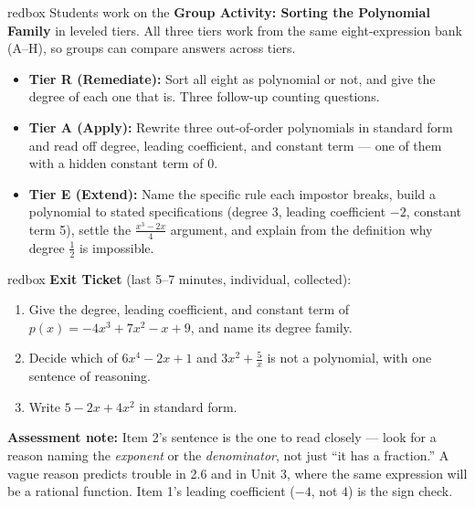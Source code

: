 \documentclass[10pt]{article}
\begin{document}
\begin{skillbox}{redbox}
Students work on the \textbf{Group Activity: Sorting the Polynomial Family} in
leveled tiers. All three tiers work from the same eight-expression bank (A--H), so
groups can compare answers across tiers.

\begin{itemize}
  \item \textbf{Tier R (Remediate):} Sort all eight as polynomial or not, and give
        the degree of each one that is. Three follow-up counting questions.
  \item \textbf{Tier A (Apply):} Rewrite three out-of-order polynomials in standard
        form and read off degree, leading coefficient, and constant term --- one
        of them with a hidden constant term of $0$.
  \item \textbf{Tier E (Extend):} Name the specific rule each impostor breaks,
        build a polynomial to stated specifications (degree 3, leading coefficient
        $-2$, constant term 5), settle the $\frac{x^3 - 2x}{4}$ argument, and
        explain from the definition why degree $\frac{1}{2}$ is impossible.
\end{itemize}
\end{skillbox}

\begin{skillbox}{redbox}
\textbf{Exit Ticket} (last 5--7 minutes, individual, collected):
\begin{enumerate}
  \item Give the degree, leading coefficient, and constant term of
        $p(x) = -4x^3 + 7x^2 - x + 9$, and name its degree family.
  \item Decide which of $6x^4 - 2x + 1$ and $3x^2 + \frac{5}{x}$ is not a
        polynomial, with one sentence of reasoning.
  \item Write $5 - 2x + 4x^2$ in standard form.
\end{enumerate}
\textbf{Assessment note:} Item 2's sentence is the one to read closely --- look for
a reason naming the \textit{exponent} or the \textit{denominator}, not just
``it has a fraction.'' A vague reason predicts trouble in 2.6 and in Unit 3, where
the same expression will be a rational function. Item 1's leading coefficient
($-4$, not $4$) is the sign check.
\end{skillbox}
\end{document}
